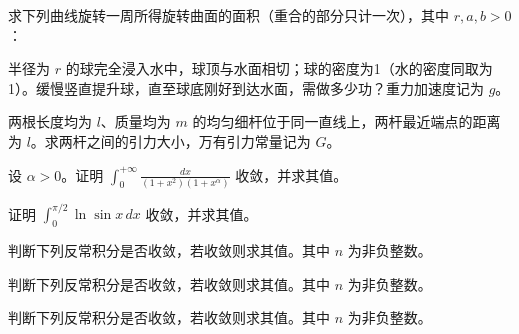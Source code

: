 \noindent\begin{minipage}{\textwidth}
求下列曲线旋转一周所得旋转曲面的面积（重合的部分只计一次），其中 $r,a,b>0$：
\end{minipage}\par\vfill
\noindent\begin{minipage}{\textwidth}
半径为 $r$ 的球完全浸入水中，球顶与水面相切；球的密度为1（水的密度同取为1）。缓慢竖直提升球，直至球底刚好到达水面，需做多少功？重力加速度记为 $g$。
\end{minipage}\par\vfill
\noindent\begin{minipage}{\textwidth}
两根长度均为 $l$、质量均为 $m$ 的均匀细杆位于同一直线上，两杆最近端点的距离为 $l$。求两杆之间的引力大小，万有引力常量记为 $G$。
\end{minipage}\par\vfill
\newpage
\noindent\begin{minipage}{\textwidth}
设 $\alpha>0$。证明 $\displaystyle\int_0^{+\infty}\frac{dx}{(1+x^2)(1+x^\alpha)}$ 收敛，并求其值。
\end{minipage}\par\vfill
\noindent\begin{minipage}{\textwidth}
证明 $\displaystyle\int_0^{\pi/2}\ln\sin x\,dx$ 收敛，并求其值。
\end{minipage}\par\vfill
\noindent\begin{minipage}{\textwidth}
判断下列反常积分是否收敛，若收敛则求其值。其中 $n$ 为非负整数。
\end{minipage}\par\vfill
\noindent\begin{minipage}{\textwidth}
判断下列反常积分是否收敛，若收敛则求其值。其中 $n$ 为非负整数。
\end{minipage}\par\vfill
\newpage
\noindent\begin{minipage}{\textwidth}
判断下列反常积分是否收敛，若收敛则求其值。其中 $n$ 为非负整数。
\end{minipage}\par\vfill

